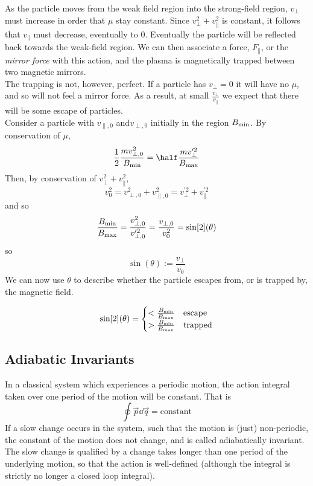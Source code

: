 \documentclass{book}         		                %
\begin{document}
As the particle moves from the weak field region into the strong-field
region, $v_\perp$ must increase in order that $\mu$ stay
constant. Since $v_\perp^2 + v_\parallel^2$ is constant, it follows
that $v_\parallel$ must decrease, eventually to $0$. Eventually the
particle will be reflected back towards the weak-field region. We can
then associate a force, $F_{\parallel}$, or the \emph{mirror force}
with this action, and the plasma is magnetically trapped between two
magnetic mirrors. \\
The trapping is not, however, perfect. If a particle has $v_{\perp}=0$
it will have no $\mu$, and so will not feel a mirror force. As a
result, at small $\frac{v_{\perp}}{v_{\parallel}}$ we expect that there
will be some escape of particles.\\
Consider a particle with $v_{\parallel,0}$ and$v_{\perp,0}$ initially
in the region $B_{\rm min}$. By conservation of $\mu$,
\[ \frac{1}{2} \frac{m v_{\perp,0}^2}{B_{\rm min}} = \half \frac{m
  v_{\perp}^{\prime 2}}{B_{\rm max}} \]
Then, by conservation of $v_{\perp}^2 + v_{\parallel}^2$,
\[v_0^2 = v_{\perp,0}^2 + v_{\parallel,0}^2 = v_{\perp}^{\prime 2} + v_{\parallel}^{\prime 2} \]
and so
\[ \frac{B_{\rm min}}{B_{\rm max}} = \frac{v_{\perp,
    0}^{2}}{v_{\perp,0}^{\prime 2}} = \frac{v_{\perp,0}}{v_0^2} =
\sin[2](\theta) \] so
\[ \sin(\theta) := \frac{v_{\perp}}{v_0} \] We can now use $\theta$ to
describe whether the particle escapes from, or is trapped by, the
magnetic field.

\begin{equation}
  \label{eq:6}
  \sin[2](\theta) = 
  \begin{cases}
    < \frac{B_{\rm min}}{B_{\rm max}} & \text{escape} \\
> \frac{B_{\rm min}}{B_{\rm max}} & \text{trapped}
  \end{cases}
\end{equation}


\subsection{Adiabatic Invariants}
\label{sec:adiabatic-invariants}

In a classical system which experiences a periodic motion, the action
integral taken over one period of the motion will be constant. That is
\[ \oint \vec{p} \dd{\vec{q}} = \text{constant} \] If a slow change
occurs in the system, such that the motion is (just) non-periodic, the
constant of the motion does not change, and is called adiabatically
invariant. The slow change is qualified by a change takes longer than
one period of the underlying motion, so that the action is
well-defined (although the integral is strictly no longer a closed
loop integral).
\end{document}
